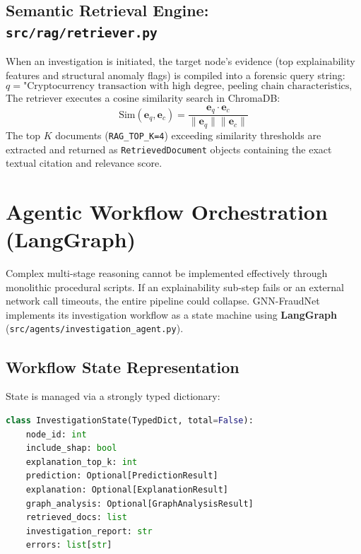 \documentclass[11pt,a4paper]{report}
\begin{document}
\section{Semantic Retrieval Engine: \texttt{src/rag/retriever.py}}
When an investigation is initiated, the target node's evidence (top explainability features and structural anomaly flags) is compiled into a forensic query string:
\[
q = \text{"Cryptocurrency transaction with high degree, peeling chain characteristics, feature\_149 importance"}
\]
The retriever executes a cosine similarity search in ChromaDB:
\[
\text{Sim}(\mathbf{e}_q, \mathbf{e}_c) = \frac{\mathbf{e}_q \cdot \mathbf{e}_c}{\|\mathbf{e}_q\| \|\mathbf{e}_c\|}
\]
The top $K$ documents (\texttt{RAG\_TOP\_K=4}) exceeding similarity thresholds are extracted and returned as \texttt{RetrievedDocument} objects containing the exact textual citation and relevance score.

\chapter{Agentic Workflow Orchestration (LangGraph)}

Complex multi-stage reasoning cannot be implemented effectively through monolithic procedural scripts. If an explainability sub-step fails or an external network call timeouts, the entire pipeline could collapse. GNN-FraudNet implements its investigation workflow as a state machine using \textbf{LangGraph} (\texttt{src/agents/investigation\_agent.py}).

\section{Workflow State Representation}
State is managed via a strongly typed dictionary:
\begin{lstlisting}[language=Python, caption={LangGraph State in \texttt{src/agents/investigation\_agent.py}}]
class InvestigationState(TypedDict, total=False):
    node_id: int
    include_shap: bool
    explanation_top_k: int
    prediction: Optional[PredictionResult]
    explanation: Optional[ExplanationResult]
    graph_analysis: Optional[GraphAnalysisResult]
    retrieved_docs: list
    investigation_report: str
    errors: list[str]
\end{lstlisting}
\end{document}
